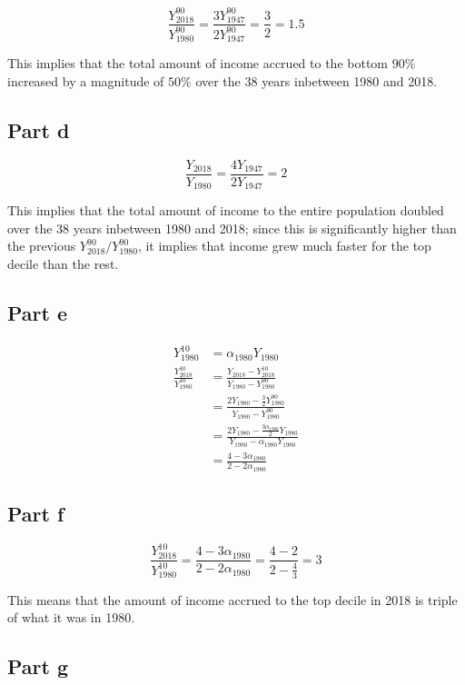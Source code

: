 \documentclass[12pt,letterpaper]{article}
\theoremstyle{definition}
\begin{document}
\[
  \frac{Y_{2018}^{90}}{Y_{1980}^{90}} = \frac{3Y_{1947}^{90}}{2Y_{1947}^{90}}
  = \frac{3}{2} = 1.5
\]

This implies that the total amount of income accrued to the bottom $90\%$
increased by a magnitude of $50\%$ over the $38$ years inbetween 1980 and 2018.

\subsection*{Part d}

\[
  \frac{Y_{2018}}{Y_{1980}} = \frac{4Y_{1947}}{2Y_{1947}} = 2
\]


This implies that the total amount of income to the entire population doubled
over the $38$ years inbetween 1980 and 2018; since this is significantly higher
than the previous $Y_{2018}^{90} / Y_{1980}^{90}$, it implies that income grew
much faster for the top decile than the rest.

\subsection*{Part e}

\begin{align*}
  Y_{1980}^{10} &= \alpha_{1980}Y_{1980} \\
  \frac{Y_{2018}^{10}}{Y_{1980}^{10}} &= \frac{Y_{2018} -
    Y_{2018}^{10}}{Y_{1980} - Y_{1980}^{90}} \\
                &= \frac{2Y_{1980} - \frac{3}{2}Y_{1980}^{90}}{Y_{1980} - Y_{1980}^{90}} \\
                &= \frac{2Y_{1980} - \frac{3\alpha_{1980}}{2}Y_{1980}}{Y_{1980} - \alpha_{1980}Y_{1980}} \\
                &= \frac{4 - 3\alpha_{1980}}{2 - 2\alpha_{1980}}
\end{align*}

\subsection*{Part f}

\[
  \frac{Y_{2018}^{10}}{Y_{1980}^{10}} = \frac{4 - 3\alpha_{1980}}{2 -
    2\alpha_{1980}} = \frac{4 - 2}{2 - \frac{4}{3}} = 3
\]

This means that the amount of income accrued to the top decile in 2018 is triple of what
it was in 1980.

\subsection*{Part g}
\end{document}
